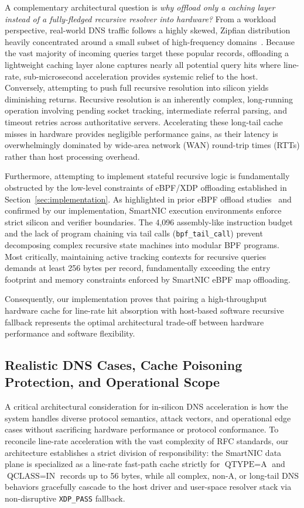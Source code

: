 \documentclass[a4paper,fleqn,colorlinks,hidelinks]{cas-sc}
\begin{document}
A complementary architectural question is \textit{why offload only a caching layer instead of a fully-fledged recursive resolver into hardware?} From a workload perspective, real-world DNS traffic follows a highly skewed, Zipfian distribution heavily concentrated around a small subset of high-frequency domains~\citep{10.1145/505202.505223}. Because the vast majority of incoming queries target these popular records, offloading a lightweight caching layer alone captures nearly all potential query hits where line-rate, sub-microsecond acceleration provides systemic relief to the host. Conversely, attempting to push full recursive resolution into silicon yields diminishing returns. Recursive resolution is an inherently complex, long-running operation involving pending socket tracking, intermediate referral parsing, and timeout retries across authoritative servers. Accelerating these long-tail cache misses in hardware provides negligible performance gains, as their latency is overwhelmingly dominated by wide-area network (WAN) round-trip times (RTTs) rather than host processing overhead.

Furthermore, attempting to implement stateful recursive logic is fundamentally obstructed by the low-level constraints of eBPF/XDP offloading established in Section~\ref{sec:implementation}. As highlighted in prior eBPF offload studies~\citep{tibav:41657} and confirmed by our implementation, SmartNIC execution environments enforce strict silicon and verifier boundaries. The 4,096 assembly-like instruction budget and the lack of program chaining via tail calls (\texttt{bpf\_tail\_call}) prevent decomposing complex recursive state machines into modular BPF programs. Most critically, maintaining active tracking contexts for recursive queries demands at least 256 bytes per record, fundamentally exceeding the entry footprint and memory constraints enforced by SmartNIC eBPF map offloading. 

Consequently, our implementation proves that pairing a high-throughput hardware cache for line-rate hit absorption with host-based software recursive fallback represents the optimal architectural trade-off between hardware performance and software flexibility.

\subsection{Realistic DNS Cases, Cache Poisoning Protection, and Operational Scope}
\label{sec:threat_model}

A critical architectural consideration for in-silicon DNS acceleration is how the system handles diverse protocol semantics, attack vectors, and operational edge cases without sacrificing hardware performance or protocol conformance. To reconcile line-rate acceleration with the vast complexity of RFC standards, our architecture establishes a strict division of responsibility: the SmartNIC data plane is specialized as a line-rate fast-path cache strictly for $\text{QTYPE}=\text{A}$ and $\text{QCLASS}=\text{IN}$ records up to 56 bytes, while all complex, non-A, or long-tail DNS behaviors gracefully cascade to the host driver and user-space resolver stack via non-disruptive \texttt{XDP\_PASS} fallback.
\end{document}
